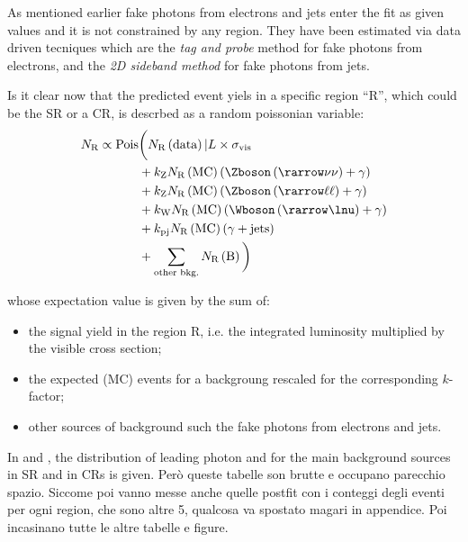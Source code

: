 As mentioned earlier fake photons from electrons and jets enter the fit as given values and it is not constrained by any region. They have been estimated via data driven tecniques which are the \emph{tag and probe} method for fake photons from electrons, and the \emph{2D sideband method} for fake photons from jets.

Is it clear now that the predicted event yiels in a specific region ``R'', which could be the SR or a CR, is descrbed as a random poissonian variable:
\begin{equation}
\begin{split}
		N_\textup{R} \propto \text{Pois} &\bigg( N_\textup{R}\left(\text{data}\right)\vert L\times\sigma_{\textup{vis}} \\
						&+ k_{\textup{Z}} N_{\textup{R}}\left(\text{MC}\right) \left(\Zboson \left(\rarrow \nu\nu \right) +  \gamma\right) \\
						&+ k_{\textup{Z}}N_\textup{R}\left(\text{MC}\right) \left(\Zboson \left(\rarrow \ell\ell\right) + \gamma \right) \\
						&+ k_{\textup{W}}N_\textup{R}\left(\text{MC}\right) \left(\Wboson \left(\rarrow \lnu\right)+ \gamma \right) \\
					 	&+ k_{\textup{pj}}N_{\textup{R}}\left(\text{MC}\right) \left(\gamma + \text{jets} \right)\\  
					 	&+ \sum_{\textup{other bkg.}} N_{\textup{R}}\left(\text{B}\right) \bigg)
\end{split}
\end{equation}

whose expectation value is given by the sum of:
\begin{itemize}
\item the signal yield in the region R, i.e. the integrated luminosity multiplied by the visible cross section;
\item the expected (MC) events for a backgroung rescaled for the corresponding $k$-factor;
\item other sources of background such the fake photons from electrons and jets.
\end{itemize}

In \Fig{\ref{fig:prefit}} and \Fig{\ref{fig:prefitcont}}, the distribution of leading photon \pt and \met for the main background sources in SR and in CRs is given. Per\`o queste tabelle son brutte e occupano parecchio spazio. Siccome poi vanno messe anche quelle postfit con i conteggi degli eventi per ogni region, che sono altre 5, qualcosa va spostato magari in appendice. Poi incasinano tutte le altre tabelle e figure.

